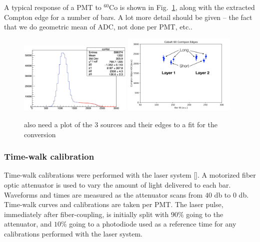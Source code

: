 \documentclass[review]{elsarticle}
\begin{document}
A typical response of a PMT to  $^{60}$Co is shown in Fig.~\ref{fig:mev_conversion}, along with the extracted Compton edge for a 
number of bars. {\color{red}A lot more detail should be given -- the fact that we do geometric mean of ADC, not done per PMT, etc.. }

\begin{figure}[h!]
	\centering
		\includegraphics[width=0.48\textwidth]{co-compton.png}
		\includegraphics[width=0.48\textwidth]{coedges.png}
	\caption{{\color{red}also need a plot of the 3 sources and their edges to a fit for the conversion}}
	\label{fig:mev_conversion}
\end{figure}

\subsubsection{Time-walk calibration}
Time-walk calibrations were performed with the laser system [{\color{red}{CITE}}]. A motorized fiber optic attenuator is used to vary
the amount of light delivered to each bar. Waveforms and times are measured as the attenuator scans from $40$ \si{\decibel} to $0$ 
\si{\decibel}. Time-walk curves and calibrations are taken per PMT. The laser pulse, immediately after fiber-coupling, is initially 
split with $90\%$ going to the attenuator, and $10\%$ going to a photodiode used as a reference time for any calibrations 
performed with the laser system.
\end{document}
